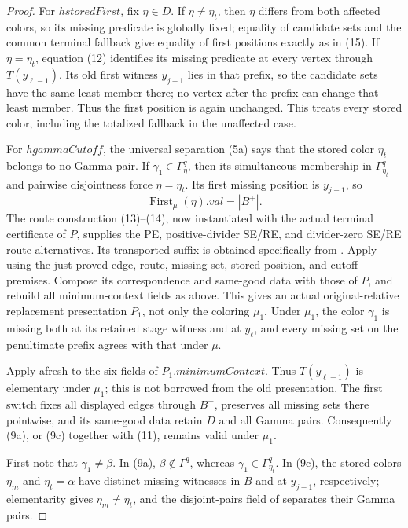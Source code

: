 \begin{proof}
For \(hstoredFirst\), fix \(\eta\in D\).  If
\(\eta\ne\eta_t\), then \(\eta\) differs from both affected colors, so
its missing predicate is globally fixed; equality of candidate sets and
the common terminal fallback give equality of first positions exactly as
in (15).  If \(\eta=\eta_t\), equation (12) identifies its missing
predicate at every vertex through \(T(y_{\ell-1})\).  Its old first
witness \(y_{j-1}\) lies in that prefix, so the candidate sets have the
same least member there; no vertex after the prefix can change that least
member.  Thus the first position is again unchanged.  This treats every
stored color, including the totalized fallback in the unaffected case.

For \(hgammaCutoff\), the universal separation (5a) says that the stored
color \(\eta_t\) belongs to no Gamma pair.  If
\(\gamma_1\in\Gamma^q_\eta\), then its simultaneous membership in
\(\Gamma^q_{\eta_t}\) and pairwise disjointness force
\(\eta=\eta_t\).  Its first missing position is \(y_{j-1}\), so
\[
       \operatorname{First}_{\mu}(\eta).\mathit{val}=|B^+|. \tag{17}
\]
The route construction (13)--(14), now instantiated with the actual
terminal certificate of \(P\), supplies the PE, positive-divider SE/RE,
and divider-zero SE/RE route alternatives.  Its transported suffix is
obtained specifically from
.  Apply
 using the just-proved edge,
route, missing-set, stored-position, and cutoff premises.  Compose its
correspondence and same-good data with those of \(P\), and rebuild all
minimum-context fields as above.  This gives an actual original-relative
replacement presentation \(P_1\), not only the coloring \(\mu_1\).
Under \(\mu_1\), the color \(\gamma_1\) is missing both at its retained
stage witness and at \(y_\ell\), and every missing set on the
penultimate prefix agrees with that under \(\mu\).

Apply  afresh to
the six fields of \(P_1.\mathit{minimumContext}\).  Thus
\(T(y_{\ell-1})\) is elementary under \(\mu_1\); this is not borrowed
from the old presentation.  The first switch fixes all displayed edges
through \(B^+\), preserves all missing sets there pointwise, and its
same-good data retain \(D\) and all Gamma pairs.  Consequently (9a), or
(9c) together with (11), remains valid under \(\mu_1\).

First note that \(\gamma_1\ne\beta\).  In (9a),
\(\beta\notin\Gamma^q\), whereas
\(\gamma_1\in\Gamma^q_{\eta_t}\).  In (9c), the stored colors
\(\eta_m\) and \(\eta_t=\alpha\) have distinct missing witnesses in
\(B\) and at \(y_{j-1}\), respectively; elementarity gives
\(\eta_m\ne\eta_t\), and the disjoint-pairs field of
 separates their Gamma pairs.


\end{proof}
